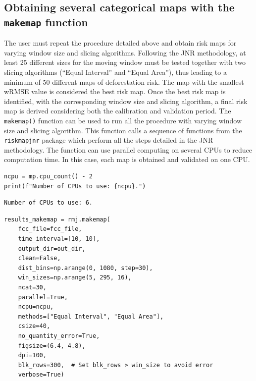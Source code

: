 \documentclass[paper=a4, 12pt, DIV=12]{scrartcl}
\begin{document}
\subsection{Obtaining several categorical maps with the \texttt{makemap} function}
\label{sec:org0f86450}

The user must repeat the procedure detailed above and obtain risk maps for varying window size and slicing algorithms. Following the JNR methodology, at least 25 different sizes for the moving window must be tested together with two slicing algorithms (``Equal Interval'' and ``Equal Area''), thus leading to a minimum of 50 different maps of deforestation risk. The map with the smallest wRMSE value is considered the best risk map. Once the best risk map is identified, with the corresponding window size and slicing algorithm, a final risk map is derived considering both the calibration and validation period. The \texttt{makemap()} function can be used to run all the procedure with varying window size and slicing algorithm. This function calls a sequence of functions from the \texttt{riskmapjnr} package which perform all the steps detailed in the JNR methodology. The function can use parallel computing on several CPUs to reduce computation time. In this case, each map is obtained and validated on one CPU. 

\begin{verbatim}
ncpu = mp.cpu_count() - 2
print(f"Number of CPUs to use: {ncpu}.") 
\end{verbatim}

\begin{verbatim}
Number of CPUs to use: 6.
\end{verbatim}


\begin{verbatim}
results_makemap = rmj.makemap(
    fcc_file=fcc_file,
    time_interval=[10, 10],
    output_dir=out_dir,
    clean=False,
    dist_bins=np.arange(0, 1080, step=30),
    win_sizes=np.arange(5, 295, 16),
    ncat=30,
    parallel=True,
    ncpu=ncpu,
    methods=["Equal Interval", "Equal Area"],
    csize=40,
    no_quantity_error=True,
    figsize=(6.4, 4.8),
    dpi=100,
    blk_rows=300,  # Set blk_rows > win_size to avoid error
    verbose=True)
\end{verbatim}
\end{document}

